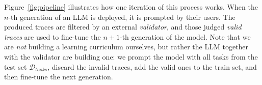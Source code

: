 Figure~\ref{fig:pipeline} illustrates how one iteration of this process
works. When the $n$-th generation of an LLM is deployed, it is prompted by their users. The produced traces are
filtered by an external \emph{validator}, and those judged \emph{valid traces}
are used to fine-tune the $n+1$-th generation of the model.
Note that we are \emph{not} building a learning curriculum ourselves, but rather the LLM together with the validator are building one: we prompt the model with all tasks from the test set $\mathcal{D}_{tasks}$, discard the invalid traces, add the valid ones to the train set, and then fine-tune the next generation.
